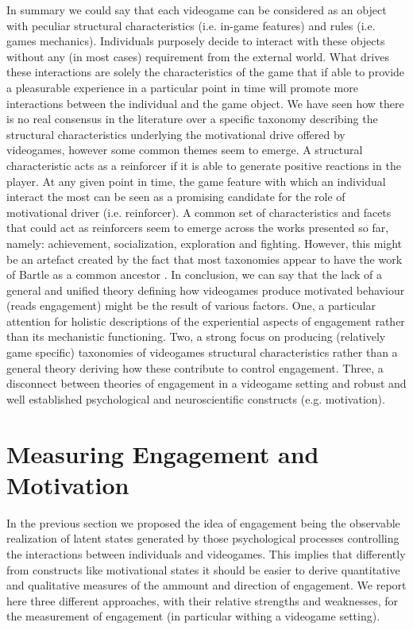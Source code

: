 In summary we could say that each videogame can be considered as an object with peculiar structural characteristics (i.e. in-game features) and rules (i.e. games mechanics). Individuals purposely decide to interact with these objects without any (in most cases) requirement from the external world. What drives these interactions are solely the characteristics of the game that if able to provide a pleasurable experience in a particular point in time will promote more interactions between the individual and the game object. We have seen how there is no real consensus in the literature over a specific taxonomy describing the structural characteristics underlying the motivational drive offered by videogames, however some common themes seem to emerge. A structural characteristic acts as a reinforcer if it is able to generate positive reactions in the player. At any given point in time, the game feature with which an individual interact the most can be seen as a promising candidate for the role of motivational driver (i.e. reinforcer). A common set of characteristics and facets that could act as reinforcers seem to emerge across the works presented so far, namely: achievement, socialization, exploration and fighting. However, this might be an artefact created by the fact that most taxonomies appear to have the work of Bartle as a common ancestor \cite{bartle1996hearts,yee2006motivations,nacke2011brainhex}. In conclusion, we can say that the lack of a general and unified theory defining how videogames produce motivated behaviour (reads engagement) might be the result of various factors. One, a particular attention for holistic descriptions of the experiential aspects of engagement rather than its mechanistic functioning. Two, a strong focus on producing (relatively game specific) taxonomies of videogames structural characteristics rather than a general theory deriving how these contribute to control engagement. Three, a disconnect between theories of engagement in a videogame setting and robust and well established psychological and neuroscientific constructs (e.g. motivation).

\section{Measuring Engagement and Motivation}
\label{measuring_motivation_engagement}
In the previous section we proposed the idea of engagement being the observable realization of latent states generated by those psychological processes controlling the interactions between individuals and videogames. This implies that differently from constructs like motivational states it should be easier to derive quantitative and qualitative measures of the ammount and direction of engagement. We report here three different approaches, with their relative strengths and weaknesses, for the measurement of engagement (in particular withing a videogame setting).


